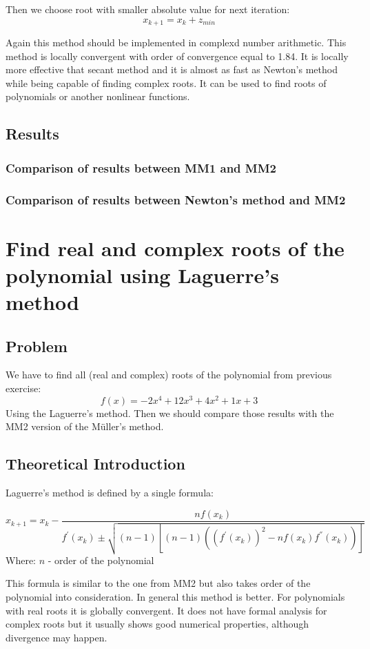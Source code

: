 \documentclass[12pt]{report}
\begin{document}
Then we choose root with smaller absolute value for next iteration:
\[ x_{k+1} = x_k + z_{min} \]

Again this method should be implemented in complexd number arithmetic.
This method is locally convergent with order of convergence equal to 1.84. It is locally more effective that secant method and it is almost as fast as Newton's method while being capable of finding complex roots. It can be used to find roots of polynomials or another nonlinear functions.

\section{Results}

\subsection{Comparison of results between MM1 and MM2}
\subsection{Comparison of results between Newton's method and MM2}

\chapter{Find real and complex roots of the polynomial using Laguerre's method}

\section{Problem}
We have to find all (real and complex) roots of the polynomial from previous exercise:
\[ f(x) = -2x^4+12x^3+4x^2+1x+3 \]
Using the Laguerre's method. Then we should compare those results with the MM2 version of the  M{\"u}ller's method.


\section{Theoretical Introduction}
Laguerre's method is defined by a single formula:

\[ x_{k+1} = x_k - \frac{nf(x_k)}{f^{'}(x_k) \pm \sqrt{(n-1)[(n-1)( (f^{'}(x_k))^2 - nf(x_k)f^{''}(x_k) )]}} \]
Where:
$n$ - order of the polynomial

This formula is similar to the one from MM2 but also takes order of the polynomial into consideration. In general this method is better. For polynomials with real roots it is globally convergent. It does not have formal analysis for complex roots but it usually shows good numerical properties, although divergence may happen.
\end{document}
